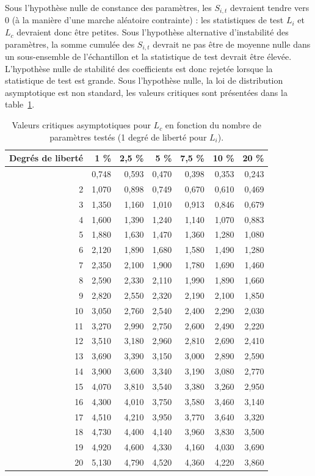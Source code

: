 \documentclass[
  a4paper,
  DIV=11,
  numbers=noendperiod,
  french]{scrartcl}
\newcommand\1{{\mathds 1}}
\theoremstyle{remark}
\begin{document}
Sous l'hypothèse nulle de constance des paramètres, les \(S_{i,t}\)
devraient tendre vers 0 (à la manière d'une marche aléatoire contrainte)
: les statistiques de test \(L_i\) et \(L_c\) devraient donc être
petites. Sous l'hypothèse alternative d'instabilité des paramètres, la
somme cumulée des \(S_{i,t}\) devrait ne pas être de moyenne nulle dans
un sous-ensemble de l'échantillon et la statistique de test devrait être
élevée. L'hypothèse nulle de stabilité des coefficients est donc rejetée
lorsque la statistique de test est grande. Sous l'hypothèse nulle, la
loi de distribution asymptotique est non standard, les valeurs critiques
sont présentées dans la table~\ref{tbl-hansen-table}.

\begin{longtable}[]{@{}rrrrrrr@{}}

\caption{\label{tbl-hansen-table}Valeurs critiques asymptotiques pour
\(L_c\) en fonction du nombre de paramètres testés (1 degré de liberté
pour \(L_i\)).}

\tabularnewline

\toprule\noalign{}
Degrés de liberté & 1 \% & 2,5 \% & 5 \% & 7,5 \% & 10 \% & 20 \% \\
\midrule\noalign{}
\endhead
\bottomrule\noalign{}
\endlastfoot
1 & 0,748 & 0,593 & 0,470 & 0,398 & 0,353 & 0,243 \\
2 & 1,070 & 0,898 & 0,749 & 0,670 & 0,610 & 0,469 \\
3 & 1,350 & 1,160 & 1,010 & 0,913 & 0,846 & 0,679 \\
4 & 1,600 & 1,390 & 1,240 & 1,140 & 1,070 & 0,883 \\
5 & 1,880 & 1,630 & 1,470 & 1,360 & 1,280 & 1,080 \\
6 & 2,120 & 1,890 & 1,680 & 1,580 & 1,490 & 1,280 \\
7 & 2,350 & 2,100 & 1,900 & 1,780 & 1,690 & 1,460 \\
8 & 2,590 & 2,330 & 2,110 & 1,990 & 1,890 & 1,660 \\
9 & 2,820 & 2,550 & 2,320 & 2,190 & 2,100 & 1,850 \\
10 & 3,050 & 2,760 & 2,540 & 2,400 & 2,290 & 2,030 \\
11 & 3,270 & 2,990 & 2,750 & 2,600 & 2,490 & 2,220 \\
12 & 3,510 & 3,180 & 2,960 & 2,810 & 2,690 & 2,410 \\
13 & 3,690 & 3,390 & 3,150 & 3,000 & 2,890 & 2,590 \\
14 & 3,900 & 3,600 & 3,340 & 3,190 & 3,080 & 2,770 \\
15 & 4,070 & 3,810 & 3,540 & 3,380 & 3,260 & 2,950 \\
16 & 4,300 & 4,010 & 3,750 & 3,580 & 3,460 & 3,140 \\
17 & 4,510 & 4,210 & 3,950 & 3,770 & 3,640 & 3,320 \\
18 & 4,730 & 4,400 & 4,140 & 3,960 & 3,830 & 3,500 \\
19 & 4,920 & 4,600 & 4,330 & 4,160 & 4,030 & 3,690 \\
20 & 5,130 & 4,790 & 4,520 & 4,360 & 4,220 & 3,860 \\

\end{longtable}
\end{document}
